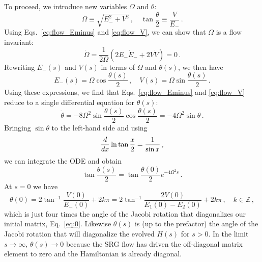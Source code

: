 {To proceed, we introduce new variables $\Omega$ and $\theta$:
\begin{equation}
  \Omega \equiv \sqrt{E_{-}^2 + V^2}\,,\quad \tan\frac{\theta}{2} \equiv \frac{V}{E_{-}}\,.
\end{equation}
Using Eqs.~\eqref{eq:flow_Eminus} and \eqref{eq:flow_V}, we can show 
that $\Omega$ is a flow invariant:
\begin{equation}
  \dot\Omega = \frac{1}{2\Omega}(2 E_{-}\dot{E}_{-} + 2 V \dot{V}) = 0\,.
\end{equation}
Rewriting $E_{-}(s)$ and $V(s)$ in terms of $\Omega$ and $\theta(s)$,
we then have
\begin{equation}\label{eq:srg_toy_parameters}
  E_{-}(s) = \Omega \cos\frac{\theta(s)}{2}\,,\quad V(s) = \Omega \sin\frac{\theta(s)}{2}\,.
\end{equation}
Using these expressions, we find that Eqs.~\eqref{eq:flow_Eminus} and \eqref{eq:flow_V}
reduce to a single differential equation for $\theta(s)$:
\begin{equation}
  \dot\theta = - 8\Omega^2\sin\frac{\theta(s)}{2}\cos\frac{\theta(s)}{2} = -4\Omega^2\sin\theta\,.
\end{equation}
Bringing $\sin\theta$ to the left-hand side and using
\begin{equation}
   \frac{d {}} {d {x}} \ln\tan\frac{x}{2}=\frac{1}{\sin x}\,,
\end{equation}
we can integrate the ODE and obtain
\begin{equation}\label{eq:srg_toy_theta}
  \tan\frac{\theta(s)}{2} = \tan\frac{\theta(0)}{2} e^{-4\Omega^2 s}\,.
\end{equation}
At $s=0$ we have
\begin{equation}
  \theta(0) = 2 \tan^{-1} \frac{V(0)}{E_{-}(0)} + 2k\pi= 2 \tan^{-1}\frac{2 V(0)}{E_{1}(0) - E_{2}(0)}+2k\pi\,,
  \quad k \in \mathbb{Z}\,,
\end{equation}
which is just four times the angle of the Jacobi rotation that diagonalizes our initial
matrix, Eq.~\eqref{eq:0}. Likewise $\theta(s)$ is (up to the prefactor) the 
angle of the Jacobi rotation that will diagonalize the evolved $H(s)$ for $s>0$. In 
the limit $s\to\infty$,
$\theta(s)\to 0$ because the SRG flow has driven the off-diagonal matrix element to 
zero and the Hamiltonian is already diagonal.

}
